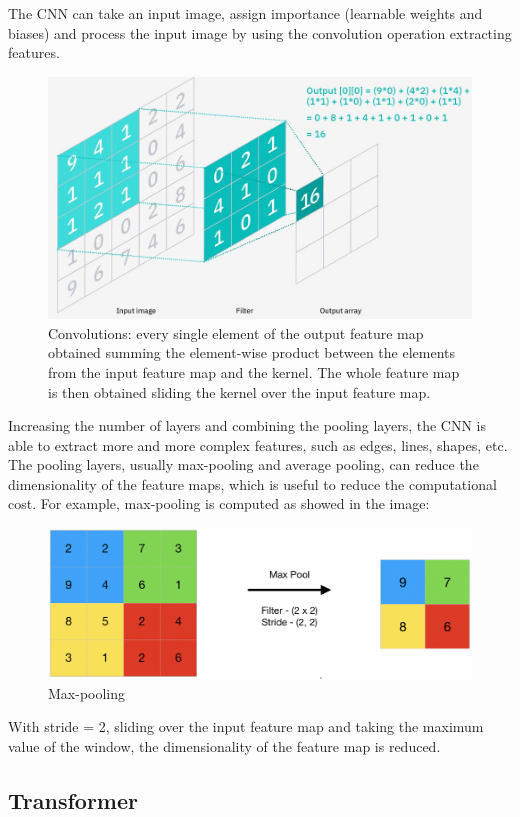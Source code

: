 The CNN can take an input image, assign importance (learnable weights and biases) and process the input image by using the convolution operation extracting features.
\begin{figure}[H]
    \centering
    \includegraphics[width=\textwidth]{images/2_convolutions}
    \caption{Convolutions: every single element of the output feature map obtained summing the element-wise product between the elements from the input feature map and the kernel. The whole feature map is then obtained sliding the kernel over the input feature map.}
    \label{fig:convolutions}
\end{figure}
Increasing the number of layers and combining the pooling layers, the CNN is able to extract more and more complex features, such as edges, lines, shapes, etc.
The pooling layers, usually max-pooling and average pooling, can reduce the dimensionality of the feature maps, which is useful to reduce the computational cost.
For example, max-pooling is computed as showed in the image:
\begin{figure}[H]
    \centering
    \includegraphics[width=\textwidth]{images/2_max_pooling}
    \caption{Max-pooling}
    \label{fig:max-pooling}
\end{figure}
With stride = 2, sliding over the input feature map and taking the maximum value of the window, the dimensionality of the feature map is reduced.
\subsection{Transformer}\label{subsec:transformer}
